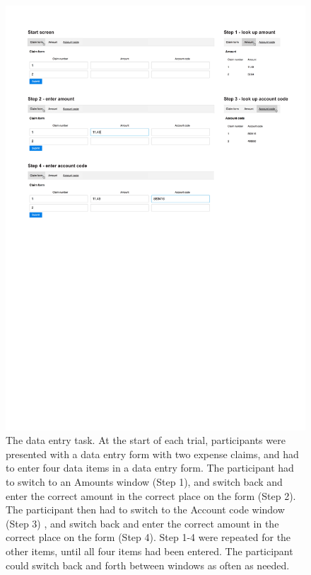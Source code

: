 \begin{figure}
 \includegraphics[width=\textwidth]{images/ch34/ch34-4_Tasksequence.pdf}
    \caption[Study 4 data entry task layout]{The data entry task. At the start of each trial, participants were presented with a data entry form with two expense claims, and had to enter four data items in a data entry form. The participant had to switch to an Amounts window (Step 1), and switch back and enter the correct amount in the correct place on the form (Step 2). The participant then had to switch to the Account code window (Step 3) , and switch back and enter the correct amount in the correct place on the form (Step 4). Step 1-4 were repeated for the other items, until all four items had been entered. The participant could switch back and forth between windows as often as needed.}\label{fig:ch34_4-tasklayout}
\end{figure}

